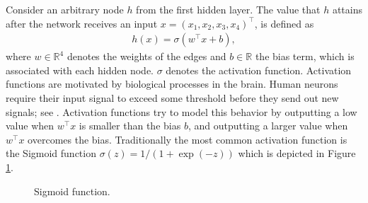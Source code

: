 Consider an arbitrary node $h$ from the first hidden layer. The value that $h$ attains
after the network receives an input $x = (x_1, x_2, x_3, x_4)^\top$, is defined as
\begin{align*}
    h(x) = \sigma(w^\top x + b),
\end{align*}
where $w \in \mathbb{R}^4$ denotes the weights of the edges and $b \in \mathbb{R}$ the
bias term, which is associated with each hidden node. $\sigma$ denotes the activation
function. Activation functions are motivated by biological processes in the brain. Human
neurons require their input signal to exceed some threshold before they send
out new signals; see \cite{Goodfellow.2016}. Activation functions try to model this
behavior by outputting a low value when $w^\top x$ is smaller than the bias $b$, and
outputting a larger value when $w^\top x$ overcomes the bias. Traditionally the most
common activation function is the Sigmoid function $\sigma(z) = {1}/{(1 + \exp(-z))}$
which is depicted in Figure \ref{fig:sigmoid_function}.

\begin{figure}[!ht]
\centering
{}
\caption{Sigmoid function.}\label{fig:sigmoid_function}
\end{figure}

